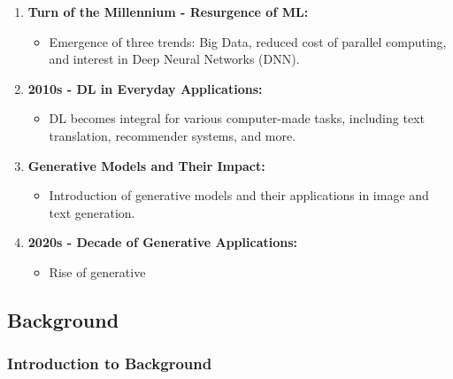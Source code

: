 \begin{frame}
\begin{enumerate}
        \item \textbf{Turn of the Millennium - Resurgence of ML:}
              \begin{itemize}
                  \item Emergence of three trends: Big Data, reduced cost of parallel computing, and interest in Deep Neural Networks (DNN).
              \end{itemize}

        \item \textbf{2010s - DL in Everyday Applications:}
              \begin{itemize}
                  \item DL becomes integral for various computer-made tasks, including text translation, recommender systems, and more.
              \end{itemize}

        \item \textbf{Generative Models and Their Impact:}
              \begin{itemize}
                  \item Introduction of generative models and their applications in image and text generation.
              \end{itemize}

        \item \textbf{2020s - Decade of Generative Applications:}
              \begin{itemize}
                  \item Rise of generative
              \end{itemize}
    \end{enumerate}
\end{frame}


\subsection{Background}

\begin{frame}
    \frametitle{Introduction to Background}
\end{frame}

